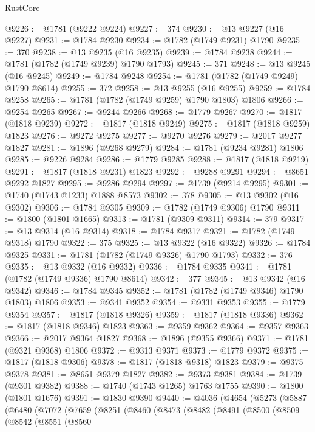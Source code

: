 \begin{lexlean}{RustCore}
\begin{coremodule}
@9226 := @1781 (@9222 @9224)
@9227 := 374
@9230 := @13 @9227 (@16 @9227)
@9231 := @1784 @9230
@9234 := @1782 (@1749 @9231) @1790
@9235 := 370
@9238 := @13 @9235 (@16 @9235)
@9239 := @1784 @9238
@9244 := @1781 (@1782 (@1749 @9239) @1790 @1793)
@9245 := 371
@9248 := @13 @9245 (@16 @9245)
@9249 := @1784 @9248
@9254 := @1781 (@1782 (@1749 @9249) @1790 @8614)
@9255 := 372
@9258 := @13 @9255 (@16 @9255)
@9259 := @1784 @9258
@9265 := @1781 (@1782 (@1749 @9259) @1790 @1803) @1806
@9266 := @9254 @9265
@9267 := @9244 @9266
@9268 := @1779 @9267
@9270 := @1817 (@1818 @9239)
@9272 := @1817 (@1818 @9249)
@9275 := @1817 (@1818 @9259) @1823
@9276 := @9272 @9275
@9277 := @9270 @9276
@9279 := @2017 @9277 @1827
@9281 := @1896 (@9268 @9279)
@9284 := @1781 (@9234 @9281) @1806
@9285 := @9226 @9284
@9286 := @1779 @9285
@9288 := @1817 (@1818 @9219)
@9291 := @1817 (@1818 @9231) @1823
@9292 := @9288 @9291
@9294 := @8651 @9292 @1827
@9295 := @9286 @9294
@9297 := @1739 (@9214 @9295)
@9301 := @1740 (@1743 @1233) @1888 @8573
@9302 := 378
@9305 := @13 @9302 (@16 @9302)
@9306 := @1784 @9305
@9309 := @1782 (@1749 @9306) @1790
@9311 := @1800 (@1801 @1665)
@9313 := @1781 (@9309 @9311)
@9314 := 379
@9317 := @13 @9314 (@16 @9314)
@9318 := @1784 @9317
@9321 := @1782 (@1749 @9318) @1790
@9322 := 375
@9325 := @13 @9322 (@16 @9322)
@9326 := @1784 @9325
@9331 := @1781 (@1782 (@1749 @9326) @1790 @1793)
@9332 := 376
@9335 := @13 @9332 (@16 @9332)
@9336 := @1784 @9335
@9341 := @1781 (@1782 (@1749 @9336) @1790 @8614)
@9342 := 377
@9345 := @13 @9342 (@16 @9342)
@9346 := @1784 @9345
@9352 := @1781 (@1782 (@1749 @9346) @1790 @1803) @1806
@9353 := @9341 @9352
@9354 := @9331 @9353
@9355 := @1779 @9354
@9357 := @1817 (@1818 @9326)
@9359 := @1817 (@1818 @9336)
@9362 := @1817 (@1818 @9346) @1823
@9363 := @9359 @9362
@9364 := @9357 @9363
@9366 := @2017 @9364 @1827
@9368 := @1896 (@9355 @9366)
@9371 := @1781 (@9321 @9368) @1806
@9372 := @9313 @9371
@9373 := @1779 @9372
@9375 := @1817 (@1818 @9306)
@9378 := @1817 (@1818 @9318) @1823
@9379 := @9375 @9378
@9381 := @8651 @9379 @1827
@9382 := @9373 @9381
@9384 := @1739 (@9301 @9382)
@9388 := @1740 (@1743 @1265) @1763 @1755
@9390 := @1800 (@1801 @1676)
@9391 := @1830 @9390
@9440 := @4036
    (@4654
      (@5273
        (@5887
          (@6480
            (@7072
              (@7659
                (@8251
                  (@8460
                    (@8473
                      (@8482
                        (@8491
                          (@8500
                            (@8509
                              (@8542
                                (@8551
                                  (@8560

\end{coremodule}
\end{lexlean}

